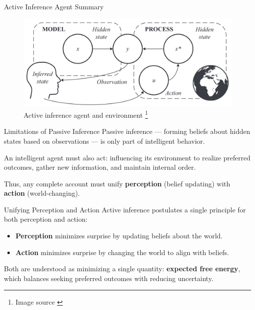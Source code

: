 \documentclass[aspectratio=1610, english]{beamer}
\begin{document}
\begin{frame}{Active Inference Agent Summary}
\begin{figure}
    \centering
    \includegraphics[width=0.95\linewidth]{img/model_and_process.png}
    \caption{Active inference agent and environment \footnote{Image source \cite{active-inference-book}}}
    \label{fig:active-inference-agent}
\end{figure}
\end{frame}

\begin{frame}{Limitations of Passive Inference}
Passive inference --- forming beliefs about hidden states based on observations --- is only part of intelligent behavior.  
\medskip

An intelligent agent must also act: influencing its environment to realize preferred outcomes, gather new information, and maintain internal order.

\medskip

Thus, any complete account must unify \textbf{perception} (belief updating) with \textbf{action} (world-changing).
\end{frame}

\begin{frame}{Unifying Perception and Action}
Active inference postulates a single principle for both perception and action:
\begin{itemize}
    \item \textbf{Perception} minimizes surprise by updating beliefs about the world.
    \item \textbf{Action} minimizes surprise by changing the world to align with beliefs.
\end{itemize}

\medskip

Both are understood as minimizing a single quantity: \textbf{expected free energy}, which balances seeking preferred outcomes with reducing uncertainty.
\end{frame}
\end{document}
